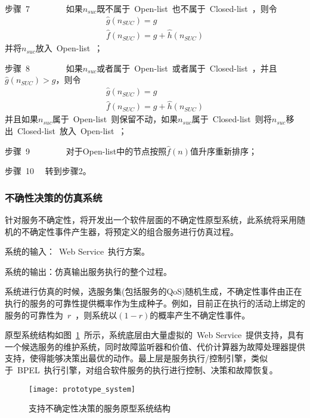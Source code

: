 步骤~7~~~~~~~~ 如果${n_{suc}}$既不属于~Open-list~也不属于~Closed-list~，则令
\[\begin{array}{l}
\hat g({n_{SUC}}) = g \\
\hat f({n_{SUC}}) = g + \hat h({n_{SUC}})
\end{array}\]
并将${n_{suc}}$放入~Open-list~；

步骤~8~~~~~~~~ 如果${n_{suc}}$或者属于~Open-list~或者属于~Closed-list~，并且$\hat g({n_{SUC}}) > g$，则令
\[\begin{array}{l}
\hat g({n_{SUC}}) = g \\
\hat f({n_{SUC}}) = g + \hat h({n_{SUC}})
\end{array}\]
并且如果${n_{suc}}$属于~Open-list~则保留不动，如果${n_{suc}}$属于~Closed-list~则将${n_{suc}}$移出~Closed-list~放入~Open-list~；

步骤~9~~~~~~~~ 对于Open-list中的节点按照$\hat f(n)$值升序重新排序；

步骤~10~~ 转到步骤2。

\subsubsection{不确性决策的仿真系统}

针对服务不确定性，将开发出一个软件层面的不确定性原型系统，此系统将采用随机的不确定性事件产生器，将预定义的组合服务进行仿真过程。

系统的输入：~Web Service~执行方案。

系统的输出：仿真输出服务执行的整个过程。

系统进行仿真的时候，选服务集(包括服务的QoS)随机生成，不确定性事件由正在执行的服务的可靠性提供概率作为生成种子。例如，目前正在执行的活动上绑定的服务的可靠性为~$r$~，则系统以$(1-r)$的概率产生不确定性事件。

原型系统结构如图~\ref{figure:prototype_system}~所示，系统底层由大量虚拟的~Web Service~提供支持，具有一个候选服务的维护系统，同时故障监听器和价值、代价计算器为故障处理器提供支持，使得能够决策出最优的动作。最上层是服务执行/控制引擎，类似于~BPEL~执行引擎，对组合软件服务的执行进行控制、决策和故障恢复。

\begin{figure}[htbp]
    \centering
    \texttt{[image: prototype\_system]}
    \caption{支持不确定性决策的服务原型系统结构}\label{figure:prototype_system}
    \vspace{-1em}
\end{figure}


